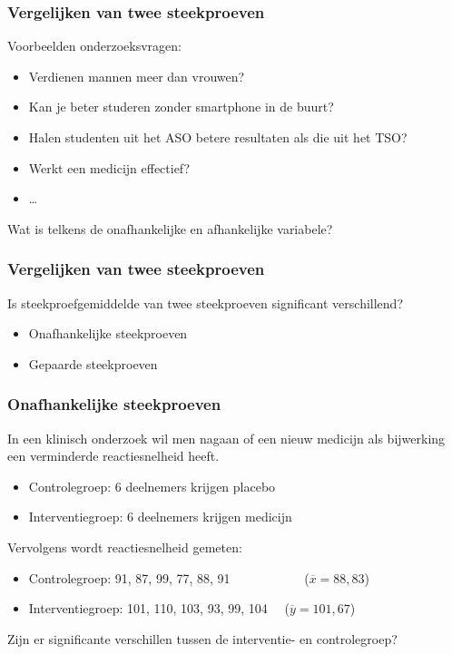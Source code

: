 \documentclass[aspectratio=169]{beamer}
\begin{document}
\begin{frame}
  \frametitle{Vergelijken van twee steekproeven}
  
  Voorbeelden onderzoeksvragen:
  
  \begin{itemize}
    \item Verdienen mannen meer dan vrouwen?
    \item Kan je beter studeren zonder smartphone in de buurt?
    \item Halen studenten uit het ASO betere resultaten als die uit het TSO?
    \item Werkt een medicijn effectief?
    \item \ldots
  \end{itemize}

  Wat is telkens de onafhankelijke en afhankelijke variabele?
\end{frame}

\begin{frame}
  \frametitle{Vergelijken van twee steekproeven}
  
  Is steekproefgemiddelde van twee steekproeven significant verschillend?
  
  \begin{itemize}
    \item Onafhankelijke steekproeven
    \item Gepaarde steekproeven
  \end{itemize}
\end{frame}

\begin{frame}
  \frametitle{Onafhankelijke steekproeven}
  
  In een klinisch onderzoek wil men nagaan of een nieuw medicijn als bijwerking een verminderde reactiesnelheid heeft.
  
  \begin{itemize}
    \item Controlegroep: 6 deelnemers krijgen placebo
    \item Interventiegroep: 6 deelnemers krijgen medicijn
  \end{itemize}
  
  \pause
  
  Vervolgens wordt reactiesnelheid gemeten:
  
  \begin{itemize}
    \item Controlegroep: 91, 87, 99, 77, 88, 91 ~~~~~~~~~~~($\overline{x}=88,83$)
    \item Interventiegroep: 101, 110, 103, 93, 99, 104 ~~($\overline{y}=101,67$)
  \end{itemize}
  
  Zijn er significante verschillen tussen de interventie- en controlegroep?
\end{frame}
\end{document}

